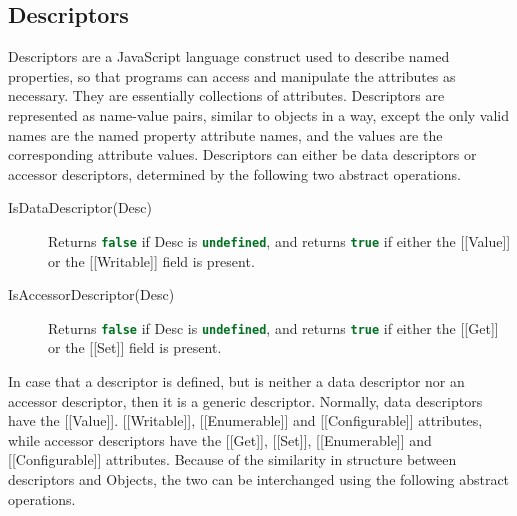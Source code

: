 \documentclass[a4paper,11pt,twoside]{report}
\def\jsinline{\lstinline[language=JavaScript, basicstyle=\small]}%\end{lstlisting}
\begin{document}
\subsection{Descriptors}\label{sec:descriptors}
Descriptors are a JavaScript language construct used to describe named properties, so that programs can access and manipulate the attributes as necessary. They are essentially collections of attributes. Descriptors are represented as name-value pairs, similar to objects in a way, except the only valid names are the named property attribute names, and the values are the corresponding attribute values. Descriptors can either be data descriptors or accessor descriptors, determined by the following two abstract operations.

\begin{description}
\item[IsDataDescriptor(Desc)] Returns \jsinline|false| if Desc is \jsinline|undefined|, and returns \jsinline|true| if either the [[Value]] or the [[Writable]] field is present.

\item[IsAccessorDescriptor(Desc)] Returns \jsinline|false| if Desc is \jsinline|undefined|, and returns \jsinline|true| if either the [[Get]] or the [[Set]] field is present.
\end{description}

In case that a descriptor is defined, but is neither a data descriptor nor an accessor descriptor, then it is a generic descriptor. Normally, data descriptors have the [[Value]]. [[Writable]], [[Enumerable]] and [[Configurable]] attributes, while accessor descriptors have the [[Get]], [[Set]], [[Enumerable]] and [[Configurable]] attributes. Because of the similarity in structure between descriptors and Objects, the two can be interchanged using the following abstract operations.
\end{document}

